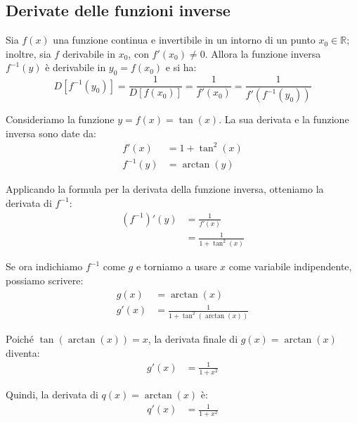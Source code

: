 \documentclass{book}
\begin{document}
\begin{theorem}
    \subsection{Derivate delle funzioni inverse}
    Sia \( f(x) \) una funzione continua e invertibile in un intorno di un punto \( x_0 \in \mathbb{R} \); inoltre, sia \( f \) derivabile in \( x_0 \), con \( f'(x_0) \neq 0 \). Allora la funzione inversa \( f^{-1}(y) \) è derivabile in \( y_0 = f(x_0) \) e si ha:
    \begin{equation}
        D[f^{-1}(y_0)] = \frac{1}{D[f(x_0)]} = \frac{1}{f'(x_0)} = \frac{1}{f'(f^{-1}(y_0))}
    \end{equation}
\end{theorem}
\begin{example}
    Consideriamo la funzione \( y = f(x) = \tan(x) \). La sua derivata e la funzione inversa sono date da:
    \begin{align*}
        f'(x)     & = 1 + \tan^2(x) \\
        f^{-1}(y) & = \arctan(y)
    \end{align*}

    Applicando la formula per la derivata della funzione inversa, otteniamo la derivata di \( f^{-1} \):
    \begin{align*}
        \left( f^{-1} \right)'(y) & = \frac{1}{f'(x)}         \\
                                  & = \frac{1}{1 + \tan^2(x)}
    \end{align*}

    Se ora indichiamo \( f^{-1} \) come \( g \) e torniamo a usare \( x \) come variabile indipendente, possiamo scrivere:
    \begin{align*}
        g(x)  & = \arctan(x)                       \\
        g'(x) & = \frac{1}{1 + \tan^2(\arctan(x))}
    \end{align*}

    Poiché \( \tan(\arctan(x)) = x \), la derivata finale di \( g(x) = \arctan(x) \) diventa:
    \begin{align*}
        g'(x) & = \frac{1}{1 + x^2}
    \end{align*}

    Quindi, la derivata di \( q(x) = \arctan(x) \) è:
    \begin{align*}
        q'(x) & = \frac{1}{1 + x^2}
    \end{align*}
\end{example}
\end{document}
